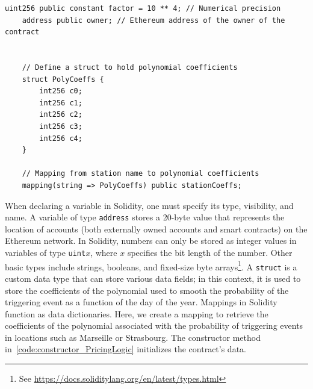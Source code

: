 \documentclass[10pt]{article}
\begin{document}
\begin{codefragment}[!h]
\begin{lstlisting}[language=Solidity]
    uint256 public constant factor = 10 ** 4; // Numerical precision
    address public owner; // Ethereum address of the owner of the contract
    

    // Define a struct to hold polynomial coefficients
    struct PolyCoeffs {
        int256 c0;
        int256 c1;
        int256 c2;
        int256 c3;
        int256 c4;
    }

    // Mapping from station name to polynomial coefficients
    mapping(string => PolyCoeffs) public stationCoeffs;
\end{lstlisting}
    \caption{Variable declaration of the \texttt{PricingLogic.sol} contract.}
    \label{code:variable_PricingLogic}
\end{codefragment}
When declaring a variable in Solidity, one must specify its type, visibility, and name. A variable of type \texttt{address} stores a 20-byte value that represents the location of accounts (both externally owned accounts and smart contracts) on the Ethereum network. In Solidity, numbers can only be stored as integer values in variables of type \texttt{uint$x$}, where $x$ specifies the bit length of the number. Other basic types include strings, booleans, and fixed-size byte arrays\footnote{See \url{https://docs.soliditylang.org/en/latest/types.html}}. A \texttt{struct} is a custom data type that can store various data fields; in this context, it is used to store the coefficients of the polynomial used to smooth the probability of the triggering event as a function of the day of the year. Mappings in Solidity function as data dictionaries. Here, we create a mapping to retrieve the coefficients of the polynomial associated with the probability of triggering events in locations such as Marseille or Strasbourg. The constructor method in~\ref{code:constructor_PricingLogic} initializes the contract's data.
\end{document}
